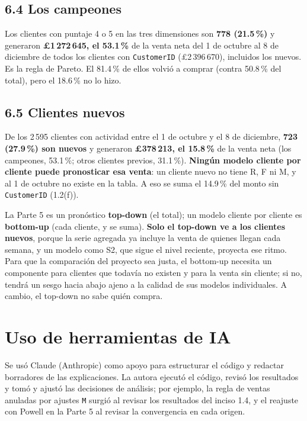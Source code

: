 \documentclass[11pt,letterpaper]{article}
\newcommand{\lib}{\pounds}
\begin{document}
\subsection*{6.4 Los campeones}

Los clientes con puntaje 4 o 5 en las tres dimensiones son \textbf{778 (21.5\,\%)} y generaron \textbf{\lib1\,272\,645, el 53.1\,\%} de la venta neta del 1 de octubre al 8 de diciembre de todos los clientes con \texttt{CustomerID} (\lib2\,396\,670), incluidos los nuevos. Es la regla de Pareto. El 81.4\,\% de ellos volvió a comprar (contra 50.8\,\% del total), pero el 18.6\,\% no lo hizo.

\subsection*{6.5 Clientes nuevos}

De los 2\,595 clientes con actividad entre el 1 de octubre y el 8 de diciembre, \textbf{723 (27.9\,\%) son nuevos} y generaron \textbf{\lib378\,213, el 15.8\,\%} de la venta neta (los campeones, 53.1\,\%; otros clientes previos, 31.1\,\%). \textbf{Ningún modelo cliente por cliente puede pronosticar esa venta}: un cliente nuevo no tiene R, F ni M, y al 1 de octubre no existe en la tabla. A eso se suma el 14.9\,\% del monto sin \texttt{CustomerID} (1.2(f)).

La Parte 5 es un pronóstico \textbf{top-down} (el total); un modelo cliente por cliente es \textbf{bottom-up} (cada cliente, y se suma). \textbf{Solo el top-down ve a los clientes nuevos}, porque la serie agregada ya incluye la venta de quienes llegan cada semana, y un modelo como S2, que sigue el nivel reciente, proyecta ese ritmo. Para que la comparación del proyecto sea justa, el bottom-up necesita un componente para clientes que todavía no existen y para la venta sin cliente; si no, tendrá un sesgo hacia abajo ajeno a la calidad de sus modelos individuales. A cambio, el top-down no sabe quién compra.

\section*{Uso de herramientas de IA}

Se usó Claude (Anthropic) como apoyo para estructurar el código y redactar borradores de las explicaciones. La autora ejecutó el código, revisó los resultados y tomó y ajustó las decisiones de análisis; por ejemplo, la regla de ventas anuladas por ajustes \texttt{M} surgió al revisar los resultados del inciso 1.4, y el reajuste con Powell en la Parte 5 al revisar la convergencia en cada origen.
\end{document}
